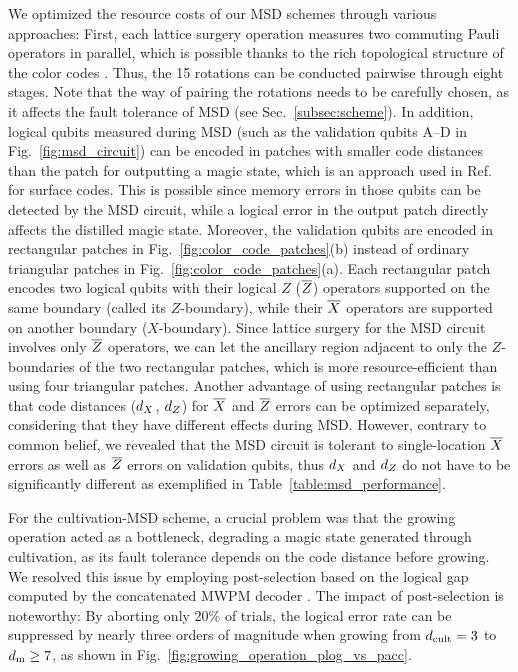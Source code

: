 \documentclass[
 prx,
 reprint,
 superscriptaddress,
 longbibliography,
 dvipsnames
]{revtex4-2}
\begin{document}
We optimized the resource costs of our MSD schemes through various approaches:
First, each lattice surgery operation measures two commuting Pauli operators in parallel, which is possible thanks to the rich topological structure of the color codes \cite{thomsen2024low}.
Thus, the 15 rotations can be conducted pairwise through eight stages.
Note that the way of pairing the rotations needs to be carefully chosen, as it affects the fault tolerance of MSD (see Sec.~\ref{subsec:scheme}).
In addition, logical qubits measured during MSD (such as the validation qubits A--D in Fig.~\ref{fig:msd_circuit}) can be encoded in patches with smaller code distances than the patch for outputting a magic state, which is an approach used in Ref.~\cite{litinski2019magic} for surface codes.
This is possible since memory errors in those qubits can be detected by the MSD circuit, while a logical error in the output patch directly affects the distilled magic state.
Moreover, the validation qubits are encoded in rectangular patches in Fig.~\ref{fig:color_code_patches}(b) instead of ordinary triangular patches in Fig.~\ref{fig:color_code_patches}(a).
Each rectangular patch encodes two logical qubits with their logical $Z$ ($\overline{Z}$) operators supported on the same boundary (called its $Z$-boundary), while their $\overline{X}$ operators are supported on another boundary ($X$-boundary).
Since lattice surgery for the MSD circuit involves only $\overline{Z}$ operators, we can let the ancillary region adjacent to only the $Z$-boundaries of the two rectangular patches, which is more resource-efficient than using four triangular patches.
Another advantage of using rectangular patches is that code distances (${d_X}$, ${d_Z}$) for $\overline{X}$ and $\overline{Z}$ errors can be optimized separately, considering that they have different effects during MSD.
However, contrary to common belief, we revealed that the MSD circuit is tolerant to single-location $\overline{X}$ errors as well as $\overline{Z}$ errors on validation qubits, thus ${d_X}$ and ${d_Z}$ do not have to be significantly different as exemplified in Table~\ref{table:msd_performance}.

\label{para:forthecultivation}
For the cultivation-MSD scheme, a crucial problem was that the growing operation acted as a bottleneck, degrading a magic state generated through cultivation, as its fault tolerance depends on the code distance before growing.
We resolved this issue by employing post-selection based on the logical gap computed by the concatenated MWPM decoder \cite{lee2025color}.
The impact of post-selection is noteworthy: By aborting only 20\% of trials, the logical error rate can be suppressed by nearly three orders of magnitude when growing from $d_\mathrm{cult}=3$ to $d_{\mathrm{m}}\geq7$, as shown in Fig.~\ref{fig:growing_operation_plog_vs_pacc}.
\end{document}
